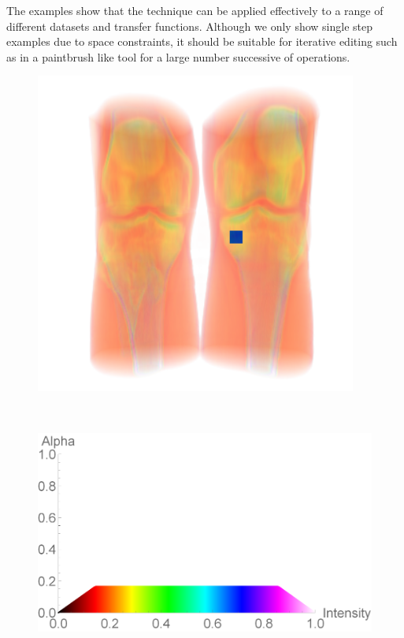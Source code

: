\documentclass[twoside,twocolumn,10pt]{article}
\begin{document}
The examples show that the technique can be applied effectively to a range of different datasets and transfer functions. Although we only show single step examples due to space constraints, it should be suitable for iterative editing such as in a paintbrush like tool for a large number successive of operations.

\begin{figure}
	\centering
	\begin{minipage}{.1\textwidth}
		\centering
		\includegraphics[width=1\linewidth]{CT-Knee_crop}
		\label{fig:CT-Knee}
	\end{minipage}~
	\begin{minipage}{.12\textwidth}
		\centering
		\includegraphics[width=1\linewidth]{tf_CT-Knee}

\end{minipage}
\end{figure}
\end{document}

